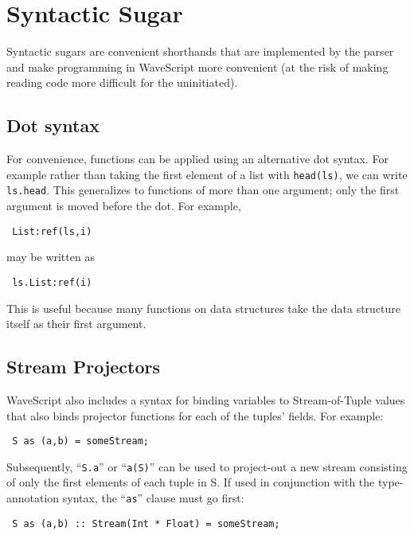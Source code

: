 \documentclass[twocolumn]{report}
\newcommand{\cd}{\tt}
\newenvironment{wscode}{\begin{center}\tt}{\end{center}}
\begin{document}
\section{Syntactic Sugar}

Syntactic sugars are convenient shorthands that are implemented by the
parser and make programming in WaveScript more convenient (at the risk
of making reading code more difficult for the uninitiated).

\subsection{Dot syntax}
  For convenience, functions can be applied using an
alternative dot syntax.  For example rather than taking the first
element of a list with {\cd head(ls)}, we can write {\cd ls.head}.
This generalizes to functions of more than one argument; only the
first argument is moved before the dot.  For example, 
\vspace{-2mm}
\begin{wscode}
List:ref(ls,i)
\end{wscode}
\vspace{-2mm}
 may be written as 
\vspace{-2mm}
\begin{wscode}
ls.List:ref(i)
\end{wscode}
\vspace{-2mm}
This is useful because many functions on data structures take the
data structure itself as their first argument.

\subsection{Stream Projectors}

WaveScript also includes a syntax for binding variables to
Stream-of-Tuple values that also binds projector functions for each of
the tuples' fields.  For example:

\begin{wscode}
S as (a,b) = someStream;
\end{wscode}

Subsequently, ``{\tt S.a}'' or ``{\tt a(S)}'' can be used to project-out a
new stream consisting of only the first elements of each tuple in {S}.  If used in
conjunction with the type-annotation syntax, the ``{\tt as}'' clause
must go first:

\begin{wscode}
S as (a,b) :: Stream(Int * Float) = someStream;
\end{wscode}
\end{document}
